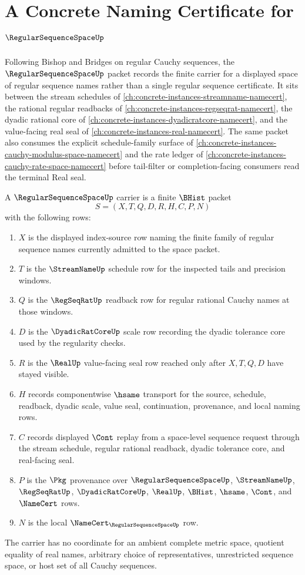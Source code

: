 \chapter{A Concrete Naming Certificate for $\RegularSequenceSpaceUp$}
\label{ch:concrete-instances-regular-sequence-space-namecert}

Following Bishop and Bridges on regular Cauchy sequences, the $\RegularSequenceSpaceUp$ packet records the finite carrier for a displayed space of regular sequence names rather than a single regular sequence certificate. It sits between the stream schedules of \autoref{ch:concrete-instances-streamname-namecert}, the rational regular readbacks of \autoref{ch:concrete-instances-regseqrat-namecert}, the dyadic rational core of \autoref{ch:concrete-instances-dyadicratcore-namecert}, and the value-facing real seal of \autoref{ch:concrete-instances-real-namecert}. The same packet also consumes the explicit schedule-family surface of \autoref{ch:concrete-instances-cauchy-modulus-space-namecert} and the rate ledger of \autoref{ch:concrete-instances-cauchy-rate-space-namecert} before tail-filter or completion-facing consumers read the terminal Real seal.

\begin{definition}
\label{def:regular-sequence-space-carrier}
A $\RegularSequenceSpaceUp$ carrier is a finite $\BHist$ packet
$$
S=(X,T,Q,D,R,H,C,P,N)
$$
with the following rows:
\begin{enumerate}
\item $X$ is the displayed index-source row naming the finite family of regular sequence names currently admitted to the space packet.
\item $T$ is the $\StreamNameUp$ schedule row for the inspected tails and precision windows.
\item $Q$ is the $\RegSeqRatUp$ readback row for regular rational Cauchy names at those windows.
\item $D$ is the $\DyadicRatCoreUp$ scale row recording the dyadic tolerance core used by the regularity checks.
\item $R$ is the $\RealUp$ value-facing seal row reached only after $X,T,Q,D$ have stayed visible.
\item $H$ records componentwise $\hsame$ transport for the source, schedule, readback, dyadic scale, value seal, continuation, provenance, and local naming rows.
\item $C$ records displayed $\Cont$ replay from a space-level sequence request through the stream schedule, regular rational readback, dyadic tolerance core, and real-facing seal.
\item $P$ is the $\Pkg$ provenance over $\RegularSequenceSpaceUp$, $\StreamNameUp$, $\RegSeqRatUp$, $\DyadicRatCoreUp$, $\RealUp$, $\BHist$, $\hsame$, $\Cont$, and $\NameCert$ rows.
\item $N$ is the local $\NameCert_{\RegularSequenceSpaceUp}$ row.
\end{enumerate}
The carrier has no coordinate for an ambient complete metric space, quotient equality of real names, arbitrary choice of representatives, unrestricted sequence space, or host set of all Cauchy sequences.
\end{definition}

